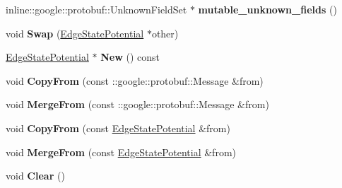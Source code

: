 \begin{DoxyCompactItemize}
\item 
\hypertarget{classgraph_1_1EdgeStatePotential_ade01e66023e544434ec77933186df507}{
inline::google::protobuf::UnknownFieldSet $\ast$ {\bfseries mutable\_\-unknown\_\-fields} ()}
\label{classgraph_1_1EdgeStatePotential_ade01e66023e544434ec77933186df507}

\item 
\hypertarget{classgraph_1_1EdgeStatePotential_ae27775781654c45f108db1186e4702a7}{
void {\bfseries Swap} (\hyperlink{classgraph_1_1EdgeStatePotential}{EdgeStatePotential} $\ast$other)}
\label{classgraph_1_1EdgeStatePotential_ae27775781654c45f108db1186e4702a7}

\item 
\hypertarget{classgraph_1_1EdgeStatePotential_a6f0a8292d587a2275ec9ea0d329ff02c}{
\hyperlink{classgraph_1_1EdgeStatePotential}{EdgeStatePotential} $\ast$ {\bfseries New} () const }
\label{classgraph_1_1EdgeStatePotential_a6f0a8292d587a2275ec9ea0d329ff02c}

\item 
\hypertarget{classgraph_1_1EdgeStatePotential_ac83756fba5134e67c234a0d6f647588d}{
void {\bfseries CopyFrom} (const ::google::protobuf::Message \&from)}
\label{classgraph_1_1EdgeStatePotential_ac83756fba5134e67c234a0d6f647588d}

\item 
\hypertarget{classgraph_1_1EdgeStatePotential_a66c8261423f9120136fb74142cd47483}{
void {\bfseries MergeFrom} (const ::google::protobuf::Message \&from)}
\label{classgraph_1_1EdgeStatePotential_a66c8261423f9120136fb74142cd47483}

\item 
\hypertarget{classgraph_1_1EdgeStatePotential_a8f55d319916f544ccef4671d036dac9e}{
void {\bfseries CopyFrom} (const \hyperlink{classgraph_1_1EdgeStatePotential}{EdgeStatePotential} \&from)}
\label{classgraph_1_1EdgeStatePotential_a8f55d319916f544ccef4671d036dac9e}

\item 
\hypertarget{classgraph_1_1EdgeStatePotential_abff176deb7b6e4934b2d7cd4d4b1bcf0}{
void {\bfseries MergeFrom} (const \hyperlink{classgraph_1_1EdgeStatePotential}{EdgeStatePotential} \&from)}
\label{classgraph_1_1EdgeStatePotential_abff176deb7b6e4934b2d7cd4d4b1bcf0}

\item 
\hypertarget{classgraph_1_1EdgeStatePotential_a83c0c837389b1ae8f84bcb894022ae35}{
void {\bfseries Clear} ()}
\label{classgraph_1_1EdgeStatePotential_a83c0c837389b1ae8f84bcb894022ae35}


\end{DoxyCompactItemize}
